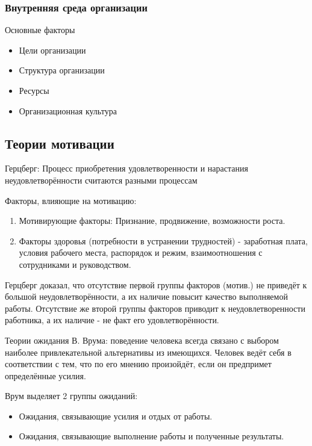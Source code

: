 \documentclass[a4paper,12pt]{report}
\begin{document}
\subsubsection{Внутренняя среда организации}
	Основные факторы
	\begin{itemize}
		\item	Цели организации
		\item	Структура организации
		\item	Ресурсы
		\item	Организационная культура
	\end{itemize}





\subsection{Теории мотивации}

	Герцберг:
	Процесс приобретения удовлетворенности и нарастания неудовлетворённости  считаются разными процессам

	Факторы, влияющие на мотивацию:
	\begin{enumerate}
		\item	Мотивирующие факторы: Признание, продвижение, возможности роста.
		\item	Факторы здоровья (потребности в устранении трудностей) - заработная плата, условия 
			рабочего места, распорядок и режим, взаимоотношения с сотрудниками и руководством.
	\end{enumerate}

	Герцберг доказал, что отсутствие первой группы факторов (мотив.) не приведёт к большой неудовлетворённости,
	 а их наличие повысит качество выполняемой работы. Отсутствие же второй группы факторов приводит к
	 неудовлетворенности работника, а их наличие - не факт его удовлетворённости.


	Теории ожидания В. Врума: поведение человека всегда связано с выбором наиболее привлекательной альтернативы 
	 из имеющихся. Человек ведёт себя в соответствии с тем, что по его мнению произойдёт, если он предпримет
	 определённые усилия.
	
	Врум выделяет 2 группы ожиданий:
	\begin{itemize}
		\item 	Ожидания, связывающие усилия и отдых от работы.
		\item	Ожидания, связывающие выполнение работы и полученные результаты.
	\end{itemize}
\end{document}
